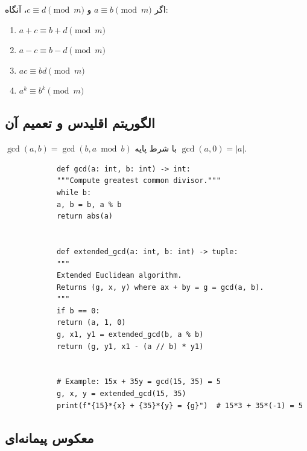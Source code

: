\documentclass{matinbook}
\begin{document}
    \begin{theorem}
        اگر $a \equiv b \pmod{m}$ و
        $c \equiv d \pmod{m}$، آنگاه:
        \begin{enumerate}
            \item $a + c \equiv b + d \pmod{m}$
            \item $a - c \equiv b - d \pmod{m}$
            \item $ac \equiv bd \pmod{m}$
            \item $a^{k} \equiv b^{k} \pmod{m}$
        \end{enumerate}
        \label{thm:congruence-properties}
    \end{theorem}
    
    \subsection{الگوریتم اقلیدس و تعمیم آن}
    
    \begin{theorem}
        $\gcd(a, b) = \gcd(b, a \bmod b)$
        با شرط پایه $\gcd(a, 0) = |a|$.
        \label{thm:euclidean}
    \end{theorem}
    
    \begin{latin}
        \begin{verbatim}
            def gcd(a: int, b: int) -> int:
            """Compute greatest common divisor."""
            while b:
            a, b = b, a % b
            return abs(a)
            
            
            def extended_gcd(a: int, b: int) -> tuple:
            """
            Extended Euclidean algorithm.
            Returns (g, x, y) where ax + by = g = gcd(a, b).
            """
            if b == 0:
            return (a, 1, 0)
            g, x1, y1 = extended_gcd(b, a % b)
            return (g, y1, x1 - (a // b) * y1)
            
            
            # Example: 15x + 35y = gcd(15, 35) = 5
            g, x, y = extended_gcd(15, 35)
            print(f"{15}*{x} + {35}*{y} = {g}")  # 15*3 + 35*(-1) = 5
        \end{verbatim}
    \end{latin}
    \label{code:gcd}
    
    \subsection{معکوس پیمانه‌ای}
    
\end{document}
